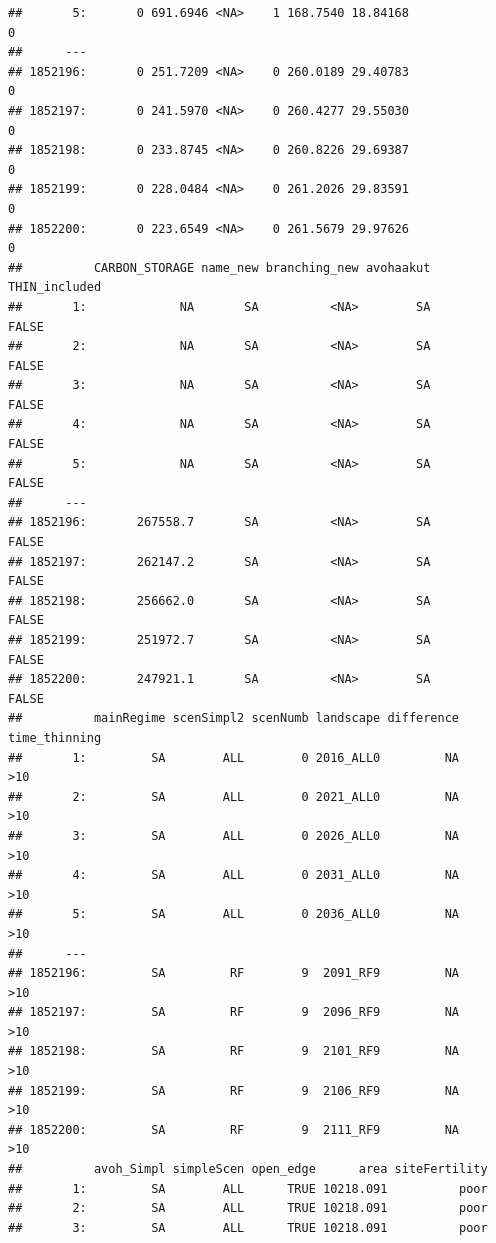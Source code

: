 \documentclass[]{elsarticle} %
\begin{document}
\begin{verbatim}
##       5:       0 691.6946 <NA>    1 168.7540 18.84168              0
##      ---                                                            
## 1852196:       0 251.7209 <NA>    0 260.0189 29.40783              0
## 1852197:       0 241.5970 <NA>    0 260.4277 29.55030              0
## 1852198:       0 233.8745 <NA>    0 260.8226 29.69387              0
## 1852199:       0 228.0484 <NA>    0 261.2026 29.83591              0
## 1852200:       0 223.6549 <NA>    0 261.5679 29.97626              0
##          CARBON_STORAGE name_new branching_new avohaakut THIN_included
##       1:             NA       SA          <NA>        SA         FALSE
##       2:             NA       SA          <NA>        SA         FALSE
##       3:             NA       SA          <NA>        SA         FALSE
##       4:             NA       SA          <NA>        SA         FALSE
##       5:             NA       SA          <NA>        SA         FALSE
##      ---                                                              
## 1852196:       267558.7       SA          <NA>        SA         FALSE
## 1852197:       262147.2       SA          <NA>        SA         FALSE
## 1852198:       256662.0       SA          <NA>        SA         FALSE
## 1852199:       251972.7       SA          <NA>        SA         FALSE
## 1852200:       247921.1       SA          <NA>        SA         FALSE
##          mainRegime scenSimpl2 scenNumb landscape difference time_thinning
##       1:         SA        ALL        0 2016_ALL0         NA           >10
##       2:         SA        ALL        0 2021_ALL0         NA           >10
##       3:         SA        ALL        0 2026_ALL0         NA           >10
##       4:         SA        ALL        0 2031_ALL0         NA           >10
##       5:         SA        ALL        0 2036_ALL0         NA           >10
##      ---                                                                  
## 1852196:         SA         RF        9  2091_RF9         NA           >10
## 1852197:         SA         RF        9  2096_RF9         NA           >10
## 1852198:         SA         RF        9  2101_RF9         NA           >10
## 1852199:         SA         RF        9  2106_RF9         NA           >10
## 1852200:         SA         RF        9  2111_RF9         NA           >10
##          avoh_Simpl simpleScen open_edge      area siteFertility
##       1:         SA        ALL      TRUE 10218.091          poor
##       2:         SA        ALL      TRUE 10218.091          poor
##       3:         SA        ALL      TRUE 10218.091          poor

\end{verbatim}
\end{document}
